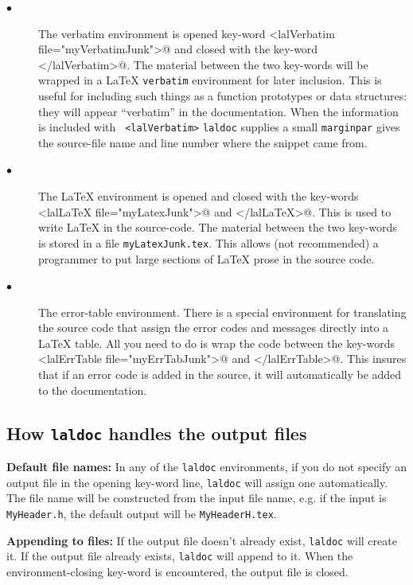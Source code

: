 \documentclass[oneside]{book}
\begin{document}
\begin{description}
\item[$\bullet$ ]
The verbatim environment is opened key-word
{\verb@<lalVerbatim file="myVerbatimJunk">@}  and closed with the key-word
{\verb@</lalVerbatim>@}. The material between the two key-words will
be wrapped in a {\LaTeX} {\tt verbatim} environment for later
inclusion.  This is useful for including such things as a function
prototypes or data structures: they will appear ``verbatim'' in the
documentation.  When the information is included with {\tt
<lalVerbatim>} {\tt laldoc} supplies a small {\tt marginpar} gives the
source-file name and line number where the snippet came from.
\vspace*{-0.05in}
\item[$\bullet$ ]
The {\LaTeX} environment is opened and closed with the key-words
{\verb@<lalLaTeX file="myLatexJunk">@}  and {\verb@</lalLaTeX>@}. This is
used to write {\LaTeX} in the source-code. The material between the two
key-words is stored in a file {\tt myLatexJunk.tex}.  This allows (not
recommended) a programmer to put large sections of {\LaTeX} prose in the
source code.
\vspace*{-0.05in}
\item[$\bullet$ ]
The error-table environment.  There is a special environment for
translating the source code that assign the error codes and messages
directly into a {\LaTeX} table. All you need to do is wrap the code
between the key-words {\verb@<lalErrTable file="myErrTabJunk">@} and
{\verb@</lalErrTable>@}.  This insures that if an error code is added
in the source, it will automatically be added to the documentation.
\vspace*{-0.051in}
\end{description}

\subsection{ How {\texttt {laldoc}} handles the output files}

{\bf Default file names:} In any of the {\texttt {laldoc}} environments,
if you do not specify an output file in the opening key-word line,
{\texttt {laldoc}} will assign one automatically. The file name will
be constructed from the input file name, e.g. if the input
is  {\tt MyHeader.h}, the default output will be {\tt MyHeaderH.tex}.

{\bf Appending to files:}
If the output file doesn't already exist, {\texttt {laldoc}} will
create it.  If the output file already exists, {\texttt {laldoc}} will
append to it.  When the environment-closing key-word is encountered,
the output file is closed.
\end{document}
